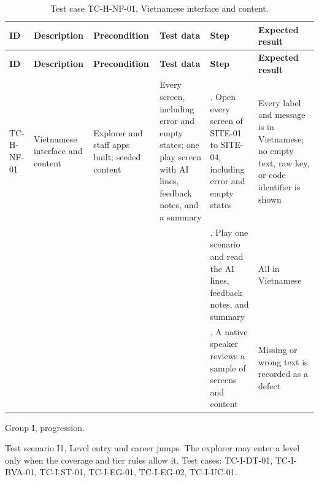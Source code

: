 {\footnotesize{}\renewcommand{\arraystretch}{1.1}
\begin{longtable}{|>{\raggedright\arraybackslash}p{}|>{\raggedright\arraybackslash}p{}|>{\raggedright\arraybackslash}p{}|>{\raggedright\arraybackslash}p{}|>{\raggedright\arraybackslash}p{}|>{\raggedright\arraybackslash}p{}|}
\caption{Test case TC-H-NF-01, Vietnamese interface and content.} \\
\hline
\textbf{ID} & \textbf{Description} & \textbf{Precondition} & \textbf{Test data} & \textbf{Step} & \textbf{Expected result} \\ \hline
\endfirsthead
\hline
\textbf{ID} & \textbf{Description} & \textbf{Precondition} & \textbf{Test data} & \textbf{Step} & \textbf{Expected result} \\ \hline
\endhead
TC-H-NF-01 & Vietnamese interface and content & Explorer and staff apps built; seeded content & Every screen, including error and empty states; one play screen with AI lines, feedback notes, and a summary & 1. Open every screen of SITE-01 to SITE-04, including error and empty states & Every label and message is in Vietnamese; no empty text, raw key, or code identifier is shown \\ \cline{5-6}
 &  &  &  & 2. Play one scenario and read the AI lines, feedback notes, and summary & All in Vietnamese \\ \cline{5-6}
 &  &  &  & 3. A native speaker reviews a sample of screens and content & Missing or wrong text is recorded as a defect \\ \hline
\end{longtable}
}

Group I, progression.

Test scenario I1, Level entry and career jumps. The explorer may enter a level only when the coverage and tier rules allow it. Test cases: TC-I-DT-01, TC-\allowbreak{}I-\allowbreak{}BVA-\allowbreak{}01, TC-I-ST-01, TC-I-EG-01, TC-I-EG-02, TC-I-UC-01.

